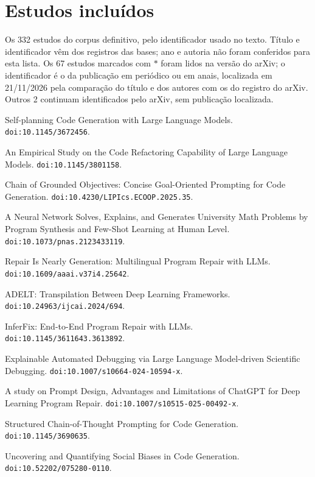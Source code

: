 \section{Estudos incluídos}\label{ap:estudos}
Os 332 estudos do corpus definitivo, pelo identificador usado no texto. Título e identificador vêm dos registros das bases; ano e autoria não foram conferidos para esta lista. Os 67 estudos marcados com $\ast$ foram lidos na versão do arXiv; o identificador é o da publicação em periódico ou em anais, localizada em 21/11/2026 pela comparação do título e dos autores com os do registro do arXiv. Outros 2 continuam identificados pelo arXiv, sem publicação localizada.

{\scriptsize\raggedright
\begin{description}\setlength{\itemsep}{0pt}\setlength{\parskip}{0pt}
\item[S1$^\ast$] Self-planning Code Generation with Large Language Models. \texttt{doi:10.1145/3672456}.
\item[S4$^\ast$] An Empirical Study on the Code Refactoring Capability of Large Language Models. \texttt{doi:10.1145/3801158}.
\item[S6] Chain of Grounded Objectives: Concise Goal-Oriented Prompting for Code Generation. \texttt{doi:10.4230/LIPIcs.ECOOP.2025.35}.
\item[S14] A Neural Network Solves, Explains, and Generates University Math Problems by Program Synthesis and Few-Shot Learning at Human Level. \texttt{doi:10.1073/pnas.2123433119}.
\item[S25$^\ast$] Repair Is Nearly Generation: Multilingual Program Repair with LLMs. \texttt{doi:10.1609/aaai.v37i4.25642}.
\item[S50$^\ast$] ADELT: Transpilation Between Deep Learning Frameworks. \texttt{doi:10.24963/ijcai.2024/694}.
\item[S53] InferFix: End-to-End Program Repair with LLMs. \texttt{doi:10.1145/3611643.3613892}.
\item[S62$^\ast$] Explainable Automated Debugging via Large Language Model-driven Scientific Debugging. \texttt{doi:10.1007/s10664-024-10594-x}.
\item[S65$^\ast$] A study on Prompt Design, Advantages and Limitations of ChatGPT for Deep Learning Program Repair. \texttt{doi:10.1007/s10515-025-00492-x}.
\item[S77] Structured Chain-of-Thought Prompting for Code Generation. \texttt{doi:10.1145/3690635}.
\item[S90$^\ast$] Uncovering and Quantifying Social Biases in Code Generation. \texttt{doi:10.52202/075280-0110}.

\end{description}}
